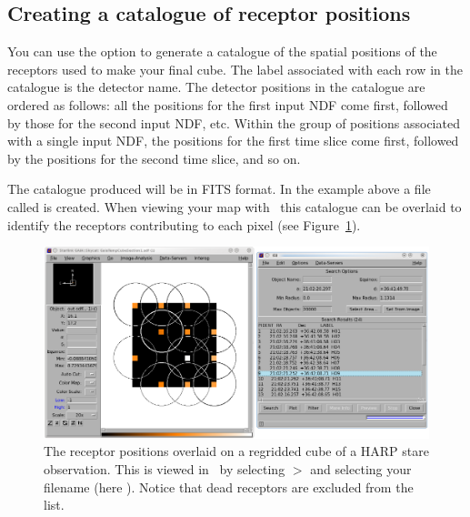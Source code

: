 \documentclass[11pt,oneside,chapters]{starlink}
\begin{document}
\subsection{Creating a catalogue of receptor positions}

You can use the option  to generate a catalogue of the
spatial positions of the receptors used to make your final cube. The
label associated with each row in the catalogue is the detector name.
The detector positions in the catalogue are ordered as follows: all
the positions for the first input NDF come first, followed by those
for the second input NDF, etc. Within the group of positions
associated with a single input NDF, the positions for the first time
slice come first, followed by the positions for the second time slice,
and so on.

\begin{terminalv}
\end{terminalv}

The catalogue produced will be in FITS format. In the example above a
file called  is created. When viewing your map with \gaia\ this
catalogue can be overlaid to identify the receptors contributing to
each pixel (see Figure~\ref{fig:makecube-outcat}).

\begin{figure}[h!]
\begin{center}
\includegraphics[width=1\linewidth]{sc20_makecube-outcat}
\caption[Displaying receptor positions in \gaia.]{\label{fig:makecube-outcat}
  The receptor positions overlaid on a regridded cube of a HARP stare
  observation. This is viewed in \gaia\ by selecting
   $>$  and selecting
  your  filename (here ). Notice that dead
  receptors are excluded from the list.}
\end{center}
\end{figure}
\end{document}
